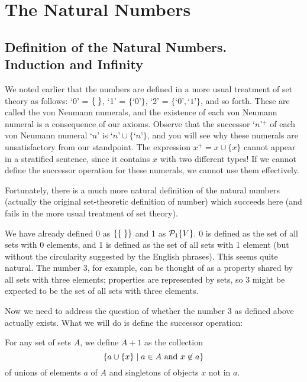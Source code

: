 \chapter{The Natural Numbers}


\section[Induction and Infinity]{Definition of the Natural Numbers.\\
Induction and Infinity}

We noted earlier that the numbers are defined in a more usual
treatment of set theory as follows: `0' = $\mbox{$\{\;\}$}$, `1' = $\{\mbox{`0'}\}$,
`2' = $\{\mbox{`0'},\mbox{`1'}\}$, and so forth.  These are called the von
Neumann
numerals, and the existence of each von Neumann numeral is a
consequence of our axioms.  Observe that the successor `$n$'$^+$ of
each von Neumann numeral `$n$' is $\mbox{`$n$'} \cup \{\mbox{`$n$'}\}$, and you
will see why these numerals are unsatisfactory from our standpoint.
The expression $x^+ = x \cup \{x\}$ cannot appear in a
stratified
sentence, since it contains $x$ with two different types!  If we cannot define the successor operation for these numerals, we cannot use them
effectively.

Fortunately, there is a much more natural definition of the
natural numbers (actually the original set-theoretic definition of
number) which succeeds here (and fails in the more
usual treatment of set theory).

We have already defined 0 as $\{\mbox{$\{\;\}$}\}$ and 1 as ${\cal P}_1\{V\}$.  0 is
defined as the set of all sets with 0 elements, and 1 is defined as
the set of all sets with 1 element (but without the circularity
suggested by the English phrases).  This seems quite natural.  The
number 3, for example, can be thought of as a property shared
by all sets with three elements; properties are represented by sets, so 3
might be expected to be the set of all sets with three elements.

Now we need to address the question of whether the number 3 as
defined above actually exists.  What we will do is define the
successor operation: 

\begin{definition}
  For any set of sets $A$, we define $A + 1$ as the
  collection
  $$
   \{a \cup \{x\} \mid \mbox{$a \in A$ and $x \not\in a$}\}
  $$
  of unions of elements $a$ of $A$ and singletons of
  objects $x$ not in $a$.
\end{definition}

